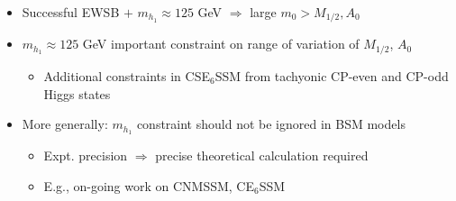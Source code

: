 \documentclass[10pt,aspectratio=169]{beamer}
\begin{document}
\begin{frame}
\begin{columns}[t]
\begin{column}{0.7\textwidth}
\begin{columns}[t]
\begin{column}{0.5\textwidth}
\begin{figure}
          \end{figure}
        \end{column}
      \end{columns}
      \begin{itemize}
      \item Successful EWSB $+$ $m_{h_1} \approx 125$ GeV $\Rightarrow$
        large $m_0 > M_{1/2}, A_0$
      \item \alert{$m_{h_1} \approx 125$ GeV important constraint on
        range of variation of $M_{1/2}$, $A_0$}
        \begin{itemize}
        \item Additional constraints in CSE$_6$SSM from tachyonic
          CP-even and CP-odd Higgs states
        \end{itemize}
      \item More generally: {\color{blue} $m_{h_1}$ constraint
        should not be ignored in BSM models}
        \begin{itemize} \itemsep0.5em
        \item Expt. precision $\Rightarrow$ \alert{precise theoretical
          calculation required}
        \item E.g., on-going work on CNMSSM, CE$_6$SSM
        \end{itemize}
      \end{itemize}
    \end{column}
  \end{columns}
\end{frame}
\end{document}
